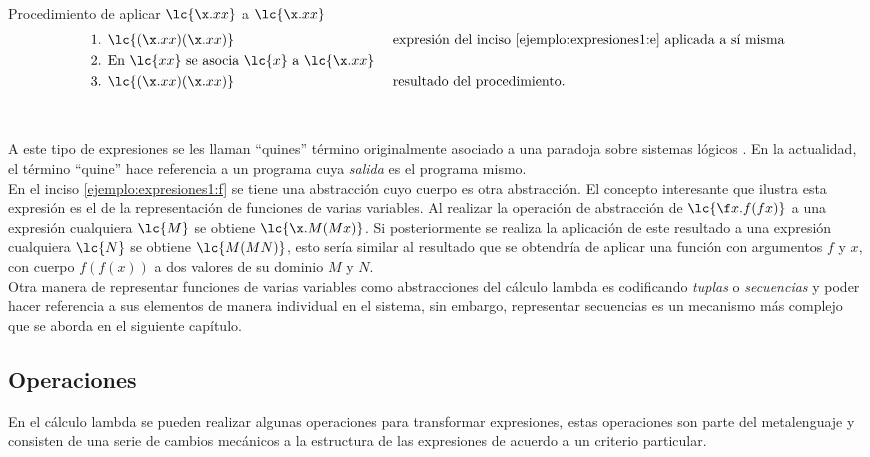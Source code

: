 \begin{ejemplo} Procedimiento de aplicar \(\lc{\x.x x}\) a \(\lc{\x.x x}\)
  \label{ejemplo:aplicacion2}
  \begin{align*}
    \text{1. } &\lc{(\x.x x)(\x.x x)} & &\text{ expresión del inciso \eqref{ejemplo:expresiones1:e} aplicada a sí misma}\\
    \text{2. } &\text{En } \lc{x x} \text{ se asocia } \lc{x} \text{ a } \lc{\x.x x} \\
    \text{3. } &\lc{(\x.x x)(\x.x x)} & &\text{ resultado del procedimiento.}
  \end{align*}
\end{ejemplo} \

A este tipo de expresiones se les llaman ``quines'' \cite[pp.~431--437]{Hofstadter:GEB} término originalmente asociado a una paradoja sobre sistemas lógicos \cite{Quine:Paradox}. En la actualidad, el término ``quine'' hace referencia a un programa cuya \emph{salida} es el programa mismo. \\

En el inciso \eqref{ejemplo:expresiones1:f} se tiene una abstracción cuyo cuerpo es otra abstracción. El concepto interesante que ilustra esta expresión es el de la representación de funciones de varias variables. Al realizar la operación de abstracción de \(\lc{\f x.f(f x)}\) a una expresión cualquiera \(\lc{M}\) se obtiene \(\lc{\x.M(M x)}\). Si posteriormente se realiza la aplicación de este resultado a una expresión cualquiera \(\lc{N}\) se obtiene \(\lc{M(M N)}\), esto sería similar al resultado que se obtendría de aplicar una función con argumentos \(f\) y \(x\), con cuerpo \(f(f(x))\) a dos valores de su dominio \(M\) y \(N\). \\

Otra manera de representar funciones de varias variables como abstracciones del cálculo lambda es codificando \emph{tuplas} o \emph{secuencias} y poder hacer referencia a sus elementos de manera individual en el sistema, sin embargo, representar secuencias es un mecanismo más complejo que se aborda en el siguiente capítulo. \\

\subsection{Operaciones}

En el cálculo lambda se pueden realizar algunas operaciones para transformar expresiones, estas operaciones son parte del metalenguaje y consisten de una serie de cambios mecánicos a la estructura de las expresiones de acuerdo a un criterio particular. \\

